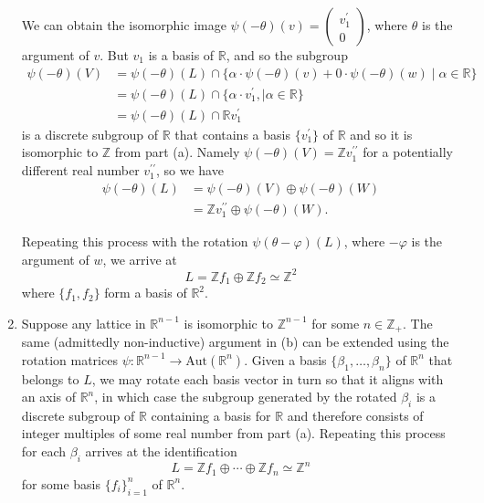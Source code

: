 \documentclass{article}
\begin{document}
\begin{Answer}
\begin{enumerate}
{      We can obtain the isomorphic image
      $\psi(-\theta)(v) =
       \left(\begin{array}{c}
         v_1^\prime \\ 0
       \end{array}\right)$,
       where $\theta$ is the argument of $v$. But $v_1$ is a basis of
       $\mathbb{R}$, and so the subgroup
       \begin{align*}
         \psi(-\theta)(V)
         &= \psi(-\theta)(L) \cap
            \{   \alpha \cdot \psi(-\theta)(v)
               + 0      \cdot \psi(-\theta)(w)
               \mid \alpha \in \mathbb{R}
            \} \\
         &= \psi(-\theta)(L) \cap
            \{ \alpha \cdot v_1^\prime,
               \mid \alpha \in \mathbb{R}
            \} \\
         &= \psi(-\theta)(L) \cap
            \mathbb{R}v_1^\prime
       \end{align*}
       is a discrete subgroup of $\mathbb{R}$ that contains a basis
       $\{ v_1^\prime \}$ of $\mathbb{R}$ and so it is
       isomorphic to $\mathbb{Z}$ from part (a). Namely
       $\psi(-\theta)(V) = \mathbb{Z} v_1^{\prime\prime}$ for a
       potentially different real number $v_1^{\prime\prime}$, so we have
       \begin{align*}
       \psi(-\theta)(L)
        &= \psi(-\theta)(V) \oplus \psi(-\theta)(W) \\
        &= \mathbb{Z} v_1^{\prime\prime} \oplus \psi(-\theta)(W).
       \end{align*}

       Repeating this process with the rotation
       $\psi(\theta-\varphi)(L)$, where $-\varphi$ is the argument of $w$,
       we arrive at
       $$
       L = \mathbb{Z} f_1 \oplus \mathbb{Z} f_2 \simeq \mathbb{Z}^2
       $$
       where $\{ f_1, f_2 \}$ form a basis of $\mathbb{R}^2$.
    }
    \item{
      Suppose any lattice in $\mathbb{R}^{n-1}$ is isomorphic to
      $\mathbb{Z}^{n-1}$ for some $n \in \mathbb{Z}_+$. The same
      (admittedly non-inductive)
      argument in (b) can be extended using the rotation matrices
      $\psi : \mathbb{R}^{n-1} \to \mathrm{Aut}(\mathbb{R}^n)$. Given
      a basis $\{ \beta_1, \dots, \beta_n \}$ of $\mathbb{R}^n$ that
      belongs to $L$, we may rotate each basis vector in turn so that
      it aligns with an axis of $\mathbb{R}^n$, in which case the
      subgroup generated by the rotated $\beta_i$ is a discrete
      subgroup of $\mathbb{R}$ containing a basis for $\mathbb{R}$ and
      therefore consists of integer multiples of some real number from
      part (a). Repeating this process for each $\beta_i$ arrives at
      the identification
      $$
      L = \mathbb{Z}f_1 \oplus \cdots \oplus \mathbb{Z}f_n \simeq \mathbb{Z}^n
      $$
      for some basis $\{ f_i \}_{i=1}^n$ of $\mathbb{R}^n$.
    }
  \end{enumerate}
\end{Answer}
\end{document}
